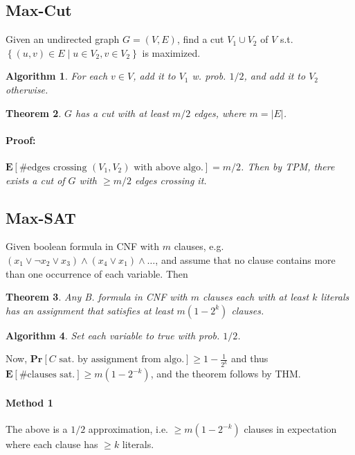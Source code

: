 \documentclass[12pt]{article}
\newtheorem{thm}{Theorem}[section]
\newtheorem{alg}[thm]{Algorithm}
\begin{document}
\subsection*{Max-Cut}
Given an undirected graph $G=(V,E)$, find a cut $V_1 \cup V_2$ of $V$ s.t. $\left\{ (u,v) \in E \; | \; u \in V_2, v \in V_2 \right\}$ is maximized. \\

\begin{alg}
For each $v \in V$, add it to $V_1$ w. prob. $1/2$, and add it to $V_2$ otherwise. \\
\end{alg}

\begin{thm}
$G$ has a cut with at least $m/2$ edges, where $m=|E|$.
\paragraph{Proof:} $\mathbf{E}[\text{\# edges crossing }(V_1,V_2)\text{ with above algo.}]=m/2$. Then by TPM, there exists a cut of $G$ with $\geq m/2$ edges crossing it.
\end{thm}

\subsection*{Max-SAT}
Given boolean formula in CNF with $m$ clauses, e.g. $(x_1 \lor \neg x_2 \lor x_3) \land (x_4 \lor x_1) \land \hdots$, and assume that no clause contains more than one occurrence of each variable. Then \\
\begin{thm}
Any B. formula in CNF with $m$ clauses each with at least $k$ literals has an assignment that satisfies at least $m(1-2^k)$ clauses. \\
\end{thm}

\begin{alg}
Set each variable to true with prob. $1/2$. \\
\end{alg}
Now, $\mathbf{Pr}[C \text{ sat. by assignment from algo.}] \geq 1-\frac{1}{2^k}$ and thus $\mathbf{E}[\text{\# clauses sat.}] \geq m(1-2^{-k})$, and the theorem follows by THM. 

\paragraph{Method 1} The above is a $1/2$ approximation, i.e. $\geq m(1-2^{-k})$ clauses in expectation where each clause has $\geq k$ literals.
\end{document}
